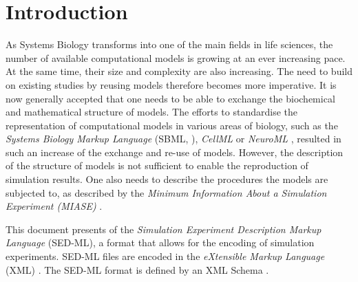 \chapter{Introduction}

As Systems Biology transforms into one of the main fields in life sciences, the number of available computational models is growing at an ever increasing pace. At the same time, their size and complexity are also increasing. The need to build on existing studies by reusing models therefore becomes more imperative. It is now generally accepted that one needs to be able to exchange the biochemical and mathematical structure of models. The efforts to standardise the representation of computational models in various areas of biology, such as the \emph{Systems Biology Markup Language} (SBML, \citet{Hucka:2003}), \emph{CellML} \citet{Lloyd:2004} or \emph{NeuroML} \citet{Goddard:2001}, resulted in such an increase of the exchange and re-use of models. However, the description of the structure of models is not sufficient to enable the reproduction of simulation results.  One also needs to describe the procedures the models are subjected to, as described by the \emph{Minimum Information About a Simulation Experiment (MIASE)} \citep{Waltemath:2011}. 

This document presents  \LoneVone of the \emph{Simulation Experiment Description Markup Language} (SED-ML), a format that allows for the encoding of simulation experiments. SED-ML files are encoded in the \emph{eXtensible Markup Language} (XML) \citep{Bray:2006}. The SED-ML format is defined by an XML Schema \citep{Fallside:2001}. 






